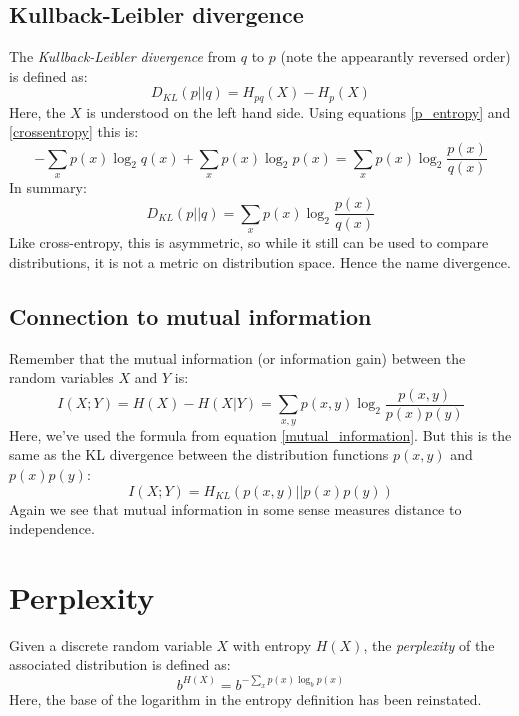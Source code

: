 \documentclass[12pt, a4paper]{article}
\numberwithin{equation}{section}
\begin{document}
\subsection{Kullback-Leibler divergence}
The \textit{Kullback-Leibler divergence} from $q$ to $p$ (note the appearantly reversed order) is defined as:
\begin{equation}
D_{KL}(p||q)=H_{pq}(X)-H_p(X)
\end{equation} 
Here, the $X$ is understood on the left hand side. Using equations \ref{p_entropy} and \ref{crossentropy} this is:
\begin{equation}
-\sum_x p(x)\log_2 q(x)+\sum_x p(x)\log_2 p(x)=\sum_x p(x)\log_2\frac{p(x)}{q(x)}
\end{equation}
In summary:
\begin{equation}
\label{kl_divergence}
D_{KL}(p||q)=\sum_x p(x)\log_2\frac{p(x)}{q(x)}
\end{equation}
Like cross-entropy, this is asymmetric, so while it still can be used to compare distributions, it is not a metric on distribution space. Hence the name divergence.

\subsection{Connection to mutual information}
Remember that the mutual information (or information gain) between the random variables $X$ and $Y$ is:
\begin{equation}
I(X;Y)=H(X)-H(X|Y)=\sum_{x,y}p(x,y)\log_2\frac{p(x,y)}{p(x)p(y)}
\end{equation}
Here, we've used the formula from equation \ref{mutual_information}. But this is the same as the KL divergence between the distribution functions $p(x,y)$ and $p(x)p(y)$:
\begin{equation}
I(X;Y)=H_{KL}(p(x,y)||p(x)p(y))
\end{equation}
Again we see that mutual information in some sense measures distance to independence.

\section{Perplexity}
Given a discrete random variable $X$ with entropy $H(X)$, the \textit{perplexity} of the associated distribution is defined as:
\begin{equation}
b^{H(X)}=b^{-\sum_x p(x)\log_b p(x)}
\end{equation}
Here, the base of the logarithm in the entropy definition has been reinstated. 
\end{document}
